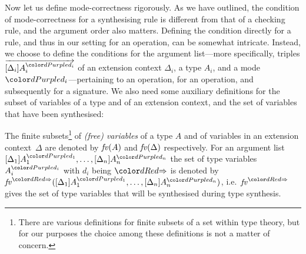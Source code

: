 Now let us define mode-correctness rigorously.
As we have outlined, the condition of mode-correctness for a synthesising rule is different from that of a checking rule, and the argument order also matters.
Defining the condition directly for a rule, and thus in our setting for an operation, can be somewhat intricate.
Instead, we choose to define the conditions for the argument list---more specifically, triples $\biargvec$ of an extension context $\Delta_i$, a type $A_i$, and a mode $\dir{d_i}$---pertaining to an operation, for an operation, and subsequently for a signature.
We also need some auxiliary definitions for the subset of variables of a type and of an extension context, and the set of variables that have been synthesised:
\begin{defn}
  The finite subsets\footnote{%
  There are various definitions for finite subsets of a set within type theory, but for our purposes the choice among these definitions is not a matter of concern.}
  of \emph{(free) variables} of a type $A$ and of variables in an extension context~$\Delta$ are denoted by $\mathit{fv}(A)$ and $\mathit{fv}(\Delta)$ respectively.
  For an argument list $\biargs$ the set of type variables $A_{i}^{\dir{d_i}}$ with $d_i$ being $\syn$ is denoted by $\synvar(\biargs)$, i.e.\ $\synvar$ gives the set of type variables that will be synthesised during type synthesis.
\end{defn}

